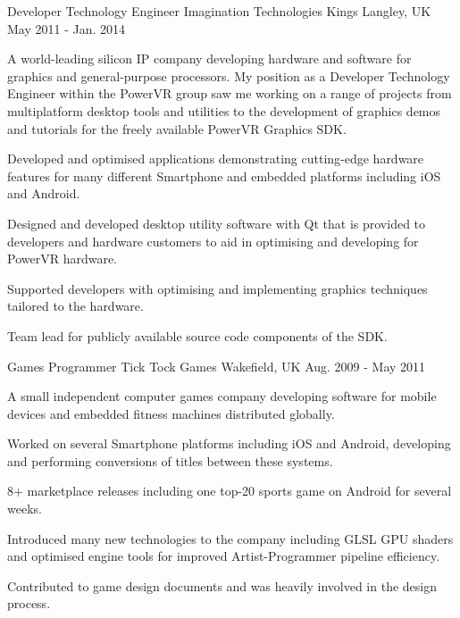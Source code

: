 \begin{cventries}
  \cventry
    {Developer Technology Engineer} %
    {Imagination Technologies} %
    {Kings Langley, UK} %
    {May 2011 - Jan. 2014} %
    {
      \begin{cventrysummary}
      A world-leading silicon IP company developing hardware and software for 
      graphics and general-purpose processors. My position as a Developer 
      Technology Engineer within the PowerVR group saw me working on a range of projects from 
      multiplatform desktop tools and utilities to the development of graphics
      demos and tutorials for the freely available PowerVR Graphics SDK.
      \end{cventrysummary}
      \begin{cvitems} %
        \item {Developed and optimised applications demonstrating cutting-edge hardware features for many different Smartphone and embedded platforms including iOS and Android.}
        \item {Designed and developed desktop utility software with Qt that is provided to developers and hardware customers to aid in optimising and developing for PowerVR hardware.}
        \item {Supported developers with optimising and implementing graphics techniques tailored to the hardware.}
        \item {Team lead for publicly available source code components of the SDK.}
      \end{cvitems}
    }

  \cventry
    {Games Programmer} %
    {Tick Tock Games} %
    {Wakefield, UK} %
    {Aug. 2009 - May 2011} %
    {
      \begin{cventrysummary}
      A small independent computer games company developing software for mobile
      devices and embedded fitness machines distributed globally.
      \end{cventrysummary}
      \begin{cvitems} %
        \item {Worked on several Smartphone platforms including iOS and Android, developing and performing conversions of titles between these systems. }
        \item {8+ marketplace releases including one top-20 sports game on Android for several weeks.}
        \item {Introduced many new technologies to the company including GLSL GPU shaders and optimised engine tools for improved Artist-Programmer pipeline efficiency.}
        \item {Contributed to game design documents and was heavily involved in the design process. }
      \end{cvitems}
    }

\end{cventries}
